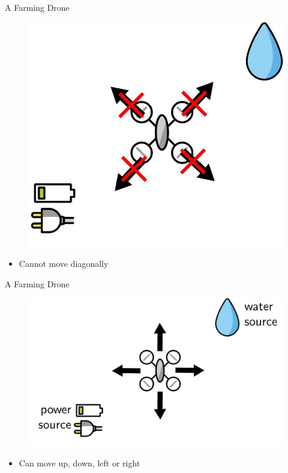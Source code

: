 \documentclass{beamer}
\begin{document}
\begin{frame}{A Farming Drone}
    \begin{figure}
        \centering
        \includegraphics[scale=0.15]{images/no-diag.jpg}
    \end{figure}
    \begin{itemize}
        \item Cannot move diagonally
    \end{itemize}
\end{frame}

\begin{frame}{A Farming Drone}
    \begin{figure}
        \centering
        \includegraphics[scale=0.15]{images/drone-move.jpg}
    \end{figure}
    \begin{itemize}
        \item Can move up, down, left or right
    \end{itemize}
\end{frame}
\end{document}
